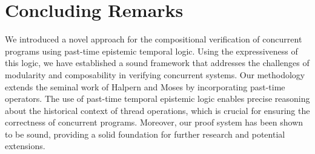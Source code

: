 \section{Concluding Remarks}
We introduced a novel approach for the compositional verification of concurrent programs using past-time epistemic temporal logic. Using the expressiveness of this logic, we have established a sound framework that addresses the challenges of modularity and composability in verifying concurrent systems. Our methodology extends the seminal work of Halpern and Moses by incorporating past-time operators. The use of past-time temporal epistemic logic enables precise reasoning about the historical context of thread operations, which is crucial for ensuring the correctness of concurrent programs. Moreover, our proof system has been shown to be sound, providing a solid foundation for further research and potential extensions.
